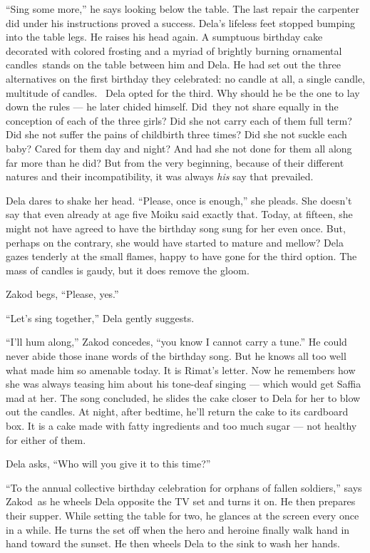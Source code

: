 \documentclass[twoside,11pt,openany]{book}
\begin{document}
``Sing some more,'' he says looking below the table. The last repair the carpenter did under
his instructions proved a success. Dela's lifeless feet stopped bumping into the table legs. He raises his head again.
A sumptuous birthday cake decorated with colored frosting and a myriad of brightly burning ornamental candles~stands on
the table between him and Dela. He had set out the three alternatives on the first birthday they celebrated: no candle
at all, a single candle, multitude of candles.~ Dela opted for the third. Why should he be the one to lay down the
rules --- he later chided himself. Did~they not share equally in the conception of each of the three girls? Did she not
carry each of them full term? Did she not suffer the pains of childbirth three times? Did she not suckle each baby?
Cared for them day and night? And had she not done for them all along far more than he did? But from the very
beginning, because of their different natures and their incompatibility, it was always \textit{his} say that
prevailed.

Dela dares to shake her head. ``Please, once is enough,'' she pleads. She doesn't say that
even already at age five Moiku said exactly that. Today, at fifteen, she might not have agreed to have the birthday
song sung for her even once. But, perhaps on the contrary, she would have started to mature and mellow? Dela gazes
tenderly at the small flames, happy to have gone for the third option. The mass of candles is gaudy, but it does
remove the gloom.

Zakod begs, ``Please, yes.''

``Let's sing together,'' Dela gently suggests.

``I'll hum along,'' Zakod concedes, ``you know I cannot carry a
tune.'' He could never abide those inane words of the birthday song. But he knows all too well what made
him so amenable today. It is Rimat's letter. Now he remembers how she was always teasing him about his tone-deaf
singing --- which would get Saffia mad at her.  The song concluded, he slides the cake closer to Dela for her to blow
out the candles.  At night, after bedtime, he'll return the cake to its cardboard box. It is a cake made with fatty
ingredients and too much sugar --- not healthy for either of them.

Dela asks, ``Who will you give it to this time?''

``To the annual collective birthday celebration for orphans of fallen soldiers,'' says
Zakod~as he wheels Dela opposite the TV set and turns it on. He then prepares their supper. While setting the table for
two, he glances at the screen every once in a while. He turns the set off when the hero and heroine finally walk hand
in hand toward the sunset. He then wheels Dela to the sink to wash her hands.
\end{document}
